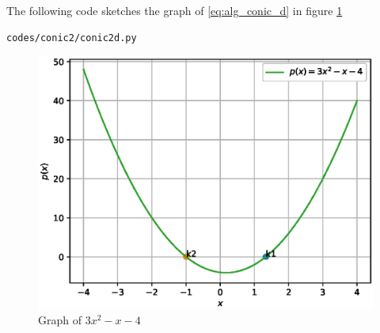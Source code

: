 \begin{enumerate}[label=\thesection.\arabic*.,ref=\thesection.\theenumi]
The following code sketches the graph of \ref{eq:alg_conic_d} in figure \ref{fig:conic2d}
\begin{lstlisting}
codes/conic2/conic2d.py
\end{lstlisting}
\begin{figure}[!ht]
\centering
\includegraphics[width=\columnwidth]{./codes/conic2/pyfigs/conic2d.eps}
\caption{Graph of $3x^{2} -x -4$}
\label{fig:conic2d}
\end{figure}


\end{enumerate}
